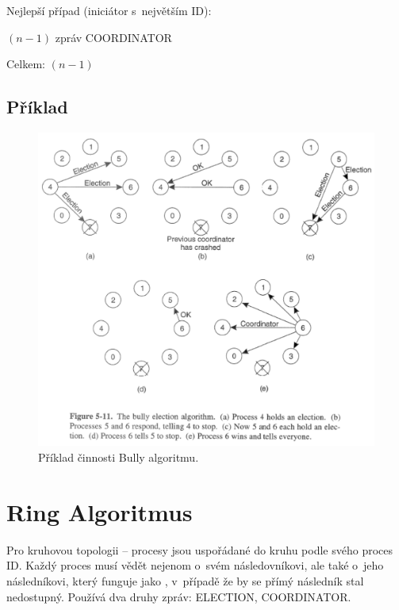 \noindent Nejlepší případ (iniciátor s~největším ID):

\begin{compactitem}
    \item $(n-1)$ zpráv COORDINATOR
    \item Celkem: $(n-1)$
\end{compactitem}

\subsection*{Příklad}

\begin{figure}[H]
    \centering
    \includegraphics[width=1\linewidth]{example_bully.pdf}
    \caption{Příklad činnosti Bully algoritmu.}
\end{figure}


\section{Ring Algoritmus}

Pro kruhovou topologii -- procesy jsou uspořádané do kruhu podle svého proces ID.
Každý proces musí vědět nejenom o~svém následovníkovi, ale také o~jeho následníkovi, který funguje jako , v~případě že by se přímý následník stal nedostupný. Používá dva druhy zpráv: ELECTION, COORDINATOR.


